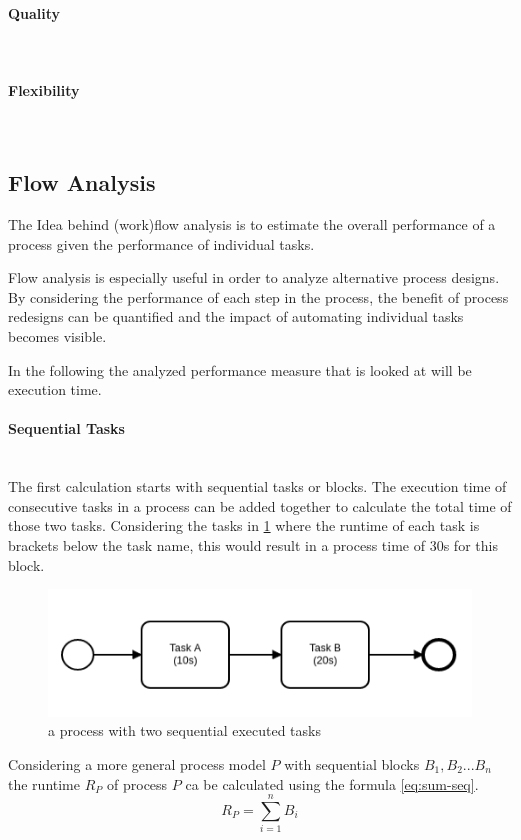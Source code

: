 \paragraph{Quality}~\\

\paragraph{Flexibility}~\\

\subsection{Flow Analysis}
The Idea behind (work)flow analysis is to estimate the overall performance of a process given the performance of individual tasks.  

Flow analysis is especially useful in order to analyze alternative process designs. By considering the performance of each step in the process, the benefit of process redesigns can be quantified and the impact of automating individual tasks becomes visible.

In the following the analyzed performance measure that is looked at will be execution time. 
\paragraph{Sequential Tasks}~\\
The first calculation starts with sequential tasks or blocks. The execution time of consecutive tasks in a process can be added together to calculate the total time of those two tasks. 
Considering the tasks in \ref{fig:sequential-tasks} where the runtime of each task is brackets below the task name, this would result in a process time of 30s for this block. \cite{ha2006approximate} \cite{fundamentals}

\begin{figure}[H]
	\centering
	\includegraphics[width=0.5\columnwidth]{graphics/sequential-tasks}
	\caption{a process with two sequential executed tasks} 
	\label{fig:sequential-tasks} 
\end{figure}

Considering a more general process model $P$ with sequential blocks $B_1,B_2 ... B_n$ the runtime $R_P$ of process $P$ ca be calculated using the formula \ref{eq:sum-seq}. 
\begin{equation}\label{eq:sum-seq}
	R_P = \displaystyle\sum_{i=1}^{n} B_i
\end{equation}

